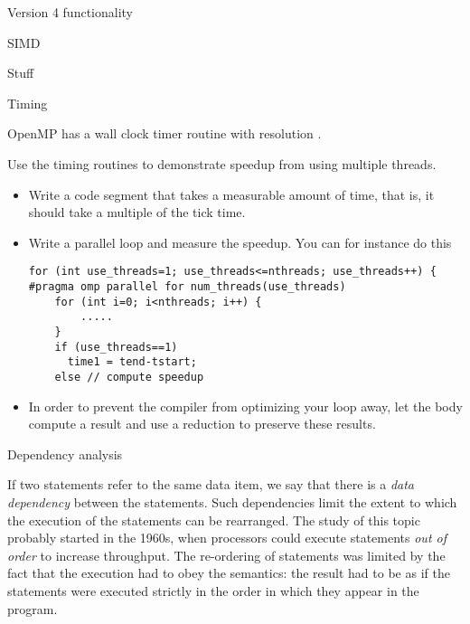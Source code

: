 {Version 4 functionality}

 {SIMD}



 {Stuff}

 {Timing}

OpenMP has a wall clock timer routine 
with resolution .

\begin{exercise}
  Use the timing routines to demonstrate speedup from using
  multiple threads.
  \begin{itemize}
  \item Write a code segment that takes a measurable amount of time, that is,
    it should take a multiple of the tick time.
  \item Write a parallel loop and measure the speedup. You can for instance do this
\begin{verbatim}
for (int use_threads=1; use_threads<=nthreads; use_threads++) {
#pragma omp parallel for num_threads(use_threads)
    for (int i=0; i<nthreads; i++) {
        .....
    }
    if (use_threads==1)
      time1 = tend-tstart;
    else // compute speedup
\end{verbatim}
\item In order to prevent the compiler from optimizing your loop away, let
  the body compute a result and use a reduction to preserve these results.
  \end{itemize}
\end{exercise}

 {Dependency analysis}

If two statements refer to the same data item,
we say that there is a \emph{data dependency} between
the statements. Such dependencies limit the extent to which
the execution of the statements can be  rearranged.
The study of this topic probably started in the 1960s,
when processors could execute statements \emph{out of order}
to increase throughput. The re-ordering of statements
was limited by the fact that the execution
had to obey the  semantics:
the result had to be as if the statements were executed
strictly in the order in which they appear in the program.

